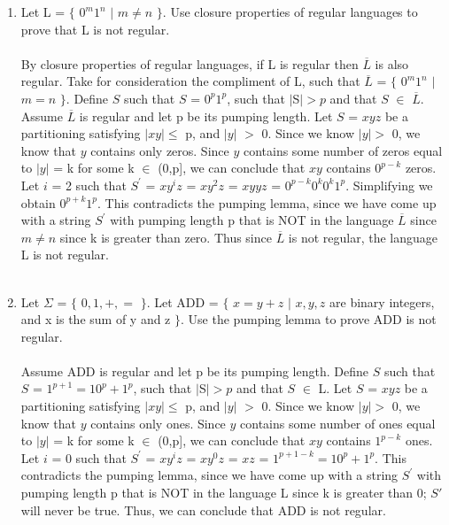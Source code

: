 \documentclass[12pt]{article}
\begin{document}
\begin{enumerate}
	\item Let L = $\{$ $0^m1^n$ $|$ $m \neq n$ $\}$. Use closure properties of regular languages to prove that L is not regular. \\ \\
	By closure properties of regular languages, if L is regular then $\overline{L}$ is also regular. Take for consideration the compliment of L, such that $\overline{L}$ = $\{$ $0^m1^n$ $|$ $m = n$ $\}$. Define $S$ such that $S$ = $0^p1^p$, such that $|$S$| > p$ and that $S$ $\in$ $\overline{L}$. Assume $\overline{L}$ is regular and let p be its pumping length. Let $S$ = $xyz$ be a partitioning satisfying $|xy| \leq$ p, and $|y|$ $>$ 0. Since we know $|y| >$ 0, we know that $y$ contains only zeros. Since $y $ contains some number of zeros equal to $|y|$ = k for some k $\in$ (0,p], we can conclude that $xy$ contains $0^{p-k}$ zeros.  Let $i$ = 2 such that $S^{'}$ = $xy^iz$ = $xy^2z$ = $xyyz$ = $0^{p-k}0^k0^k1^p$. Simplifying we obtain $0^{p+k}1^p$. This contradicts the pumping lemma, since we have come up with a string $S^{'}$ with pumping length p that is NOT in the language $\overline{L}$ since $m \neq n$ since k is greater than zero. Thus since $\overline{L}$ is not regular, the language L is not regular. \\ \\

	\item Let $\Sigma$ = $\{$ $0,1,+,=$ $\}$. Let ADD = $\{$ $x = y + z$ $|$ $x,y,z$ are binary integers, and x is the sum of y and z $\}$. Use the pumping lemma to prove ADD is not regular. \\ \\
	Assume ADD is regular and let p be its pumping length. Define $S$ such that $S$ = $1^{p+1} = 10^p + 1^p$, such that $|$S$| > p$ and that $S$ $\in$ L. Let $S$ = $xyz$ be a partitioning satisfying $|xy| \leq$ p, and $|y|$ $>$ 0. Since we know $|y| >$ 0, we know that $y$ contains only ones. Since $y$ contains some number of ones equal to $|y|$ = k for some k $\in$ (0,p], we can conclude that $xy$ contains $1^{p-k}$ ones. Let $i$ = 0 such that $S^{'}$ = $xy^iz$ = $xy^0z$ = $xz$ = $1^{p+1-k} = 10^p + 1^p$. This contradicts the pumping lemma, since we have come up with a string $S^{'}$ with pumping length p that is NOT in the language L since k is greater than 0; $S{'}$ will never be true. Thus, we can conclude that ADD is not regular. \\ \\
	

\end{enumerate}
\end{document}
